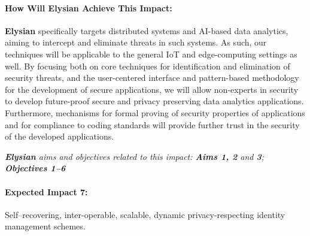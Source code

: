 \documentclass[a4paper,11pt]{article}
\newcommand{\project}[1]{\textbf{#1}\xspace}
\newcommand{\SECURITY}{\project{Elysian}}
\newcommand{\TheProject}{\SECURITY}
\begin{document}
\begin{mdframed}[backgroundcolor=gray!10]
\paragraph{How Will \TheProject{} Achieve This Impact:}
\TheProject{} specifically targets distributed systems and AI-based data analytics, aiming to intercept and eliminate threats in such systems. As such, our techniques will be applicable to the general IoT and edge-computing settings as well. By focusing both on core techniques for identification and elimination of security threats, and the user-centered interface and pattern-based methodology for the development of secure applications, we will allow non-experts in security to develop future-proof secure and privacy preserving data analytics applications. Furthermore, mechanisms for formal proving of security properties of applications and for compliance to coding standards will provide further trust in the security of the developed applications.

\emph{\TheProject{} aims and objectives related to this impact: \textbf{Aims 1, 2}  and \textbf{3}; \textbf{Objectives 1--6} }

\end{mdframed}

\begin{mdframed}[backgroundcolor=blue!5]
\paragraph{Expected Impact 7:}
Self–recovering, inter-operable, scalable, dynamic privacy-respecting identity management schemes.
\end{mdframed}
\end{document}
